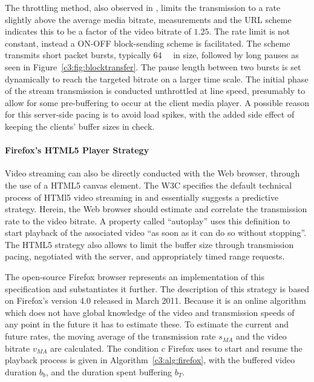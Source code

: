 The throttling method, also observed in \cite{alcock2011afcyt}, limits the transmission to a rate slightly above the average media bitrate, measurements and the \gls{URL} scheme indicates this to be a factor of the video bitrate of $1.25$. The rate limit is not constant, instead a ON-OFF block-sending scheme is facilitated. The scheme transmits short packet bursts, typically \SI{64}{\kibi\byte} in size, followed by long pauses as seen in Figure~\ref{c3:fig:blocktransfer}. The pause length between two bursts is set dynamically to reach the targeted bitrate on a larger time scale. The initial phase of the stream transmission is conducted unthrottled at line speed, presumably to allow for some pre-buffering to occur at the client media player. A possible reason for this server-side pacing is to avoid load spikes, with the added side effect of keeping the clients' buffer sizes in check.



\paragraph{Firefox's HTML5 Player Strategy}

Video streaming can also be directly conducted with the Web browser, through the use of a HTML5 canvas element. The \gls{W3C} specifies the default technical process of HTMl5 video streaming in \cite{html5video} and essentially suggests a predictive strategy. Herein, the Web browser should estimate and correlate the transmission rate to the video bitrate. A property called ``autoplay'' uses this definition to start  playback of the associated video \enquote{as soon as it can do so without stopping}. The HTML5 strategy also allows to limit the buffer size through transmission pacing, negotiated with the server, and appropriately timed range requests.

The open-source Firefox browser represents an implementation of this specification and substantiates it further. The description of this strategy is based on Firefox's version 4.0 released in March 2011. Because it is an online algorithm which does not have global knowledge of the video and transmission speeds of any point in the future it has to estimate these.
To estimate the current and future rates, the moving average of the transmission rate $s_{MA}$ and the video bitrate $v_{MA}$ are calculated. The condition $c$ Firefox uses to start and resume the playback process is given in Algorithm~\ref{c3:alg:firefox}, with the buffered video duration $b_b$, and the duration spent buffering $b_T$.

